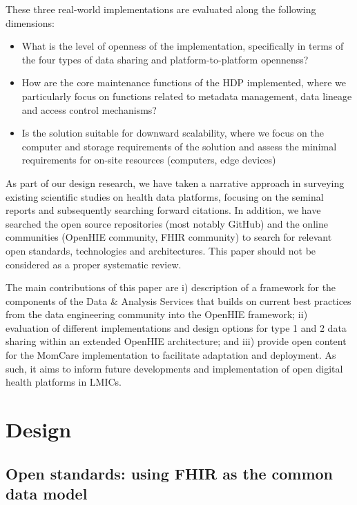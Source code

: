 \documentclass[
  authoryear]{elsarticle}
\providecommand{\tightlist}{%
  \setlength{\itemsep}{0pt}\setlength{\parskip}{0pt}}\usepackage{longtable,booktabs,array}
\begin{document}
These three real-world implementations are evaluated along the following
dimensions:

\begin{itemize}
\tightlist
\item
  What is the level of openness of the implementation, specifically in
  terms of the four types of data sharing and platform-to-platform
  opennenss?
\item
  How are the core maintenance functions of the HDP implemented, where
  we particularly focus on functions related to metadata management,
  data lineage and access control mechanisms?
\item
  Is the solution suitable for downward scalability, where we focus on
  the computer and storage requirements of the solution and assess the
  minimal requirements for on-site resources (computers, edge devices)
\end{itemize}

As part of our design research, we have taken a narrative approach in
surveying existing scientific studies on health data platforms, focusing
on the seminal reports and subsequently searching forward citations. In
addition, we have searched the open source repositories (most notably
GitHub) and the online communities (OpenHIE community, FHIR community)
to search for relevant open standards, technologies and architectures.
This paper should not be considered as a proper systematic review.

The main contributions of this paper are i) description of a framework
for the components of the Data \& Analysis Services that builds on
current best practices from the data engineering community into the
OpenHIE framework; ii) evaluation of different implementations and
design options for type 1 and 2 data sharing within an extended OpenHIE
architecture; and iii) provide open content for the MomCare
implementation to facilitate adaptation and deployment. As such, it aims
to inform future developments and implementation of open digital health
platforms in LMICs.

\section{Design}\label{design}

\subsection{Open standards: using FHIR as the common data
model}\label{open-standards-using-fhir-as-the-common-data-model}
\end{document}
